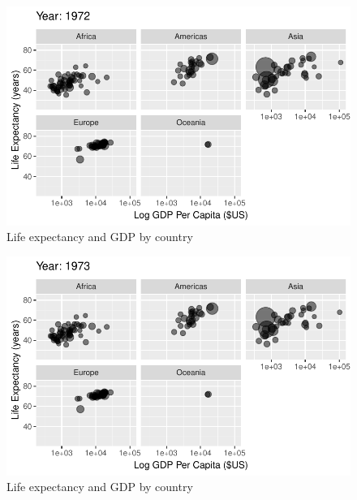 \documentclass[
  letterpaper,
  DIV=11,
  numbers=noendperiod]{scrreport}
\theoremstyle{definition}
\theoremstyle{remark}
\begin{document}
\begin{figure}

{\centering \includegraphics{index_files/figure-pdf/fig-anim-lifegdp-37.pdf}

}

\caption{\label{fig-anim-lifegdp-37}Life expectancy and GDP by country}

\end{figure}

\begin{figure}

{\centering \includegraphics{index_files/figure-pdf/fig-anim-lifegdp-38.pdf}

}

\caption{\label{fig-anim-lifegdp-38}Life expectancy and GDP by country}

\end{figure}
\end{document}
